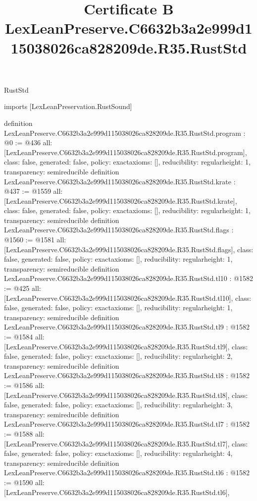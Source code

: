 \begin{lexlean}{RustStd}
\title{Certificate B LexLeanPreserve.C6632b3a2e999d115038026ca828209de.R35.RustStd}
\begin{coremodule}
imports [LexLeanPreservation.RustSound]

definition LexLeanPreserve.C6632b3a2e999d115038026ca828209de.R35.RustStd.program : @0 := @436 {
  all: [LexLeanPreserve.C6632b3a2e999d115038026ca828209de.R35.RustStd.program],
  class: false,
  generated: false,
  policy: exact{axioms: []},
  reducibility: regular{height: 1},
  transparency: semireducible
}
definition LexLeanPreserve.C6632b3a2e999d115038026ca828209de.R35.RustStd.krate : @437 := @1559 {
  all: [LexLeanPreserve.C6632b3a2e999d115038026ca828209de.R35.RustStd.krate],
  class: false,
  generated: false,
  policy: exact{axioms: []},
  reducibility: regular{height: 1},
  transparency: semireducible
}
definition LexLeanPreserve.C6632b3a2e999d115038026ca828209de.R35.RustStd.flags : @1560 := @1581 {
  all: [LexLeanPreserve.C6632b3a2e999d115038026ca828209de.R35.RustStd.flags],
  class: false,
  generated: false,
  policy: exact{axioms: []},
  reducibility: regular{height: 1},
  transparency: semireducible
}
definition LexLeanPreserve.C6632b3a2e999d115038026ca828209de.R35.RustStd.tl10 : @1582 := @425 {
  all: [LexLeanPreserve.C6632b3a2e999d115038026ca828209de.R35.RustStd.tl10],
  class: false,
  generated: false,
  policy: exact{axioms: []},
  reducibility: regular{height: 1},
  transparency: semireducible
}
definition LexLeanPreserve.C6632b3a2e999d115038026ca828209de.R35.RustStd.tl9 : @1582 := @1584 {
  all: [LexLeanPreserve.C6632b3a2e999d115038026ca828209de.R35.RustStd.tl9],
  class: false,
  generated: false,
  policy: exact{axioms: []},
  reducibility: regular{height: 2},
  transparency: semireducible
}
definition LexLeanPreserve.C6632b3a2e999d115038026ca828209de.R35.RustStd.tl8 : @1582 := @1586 {
  all: [LexLeanPreserve.C6632b3a2e999d115038026ca828209de.R35.RustStd.tl8],
  class: false,
  generated: false,
  policy: exact{axioms: []},
  reducibility: regular{height: 3},
  transparency: semireducible
}
definition LexLeanPreserve.C6632b3a2e999d115038026ca828209de.R35.RustStd.tl7 : @1582 := @1588 {
  all: [LexLeanPreserve.C6632b3a2e999d115038026ca828209de.R35.RustStd.tl7],
  class: false,
  generated: false,
  policy: exact{axioms: []},
  reducibility: regular{height: 4},
  transparency: semireducible
}
definition LexLeanPreserve.C6632b3a2e999d115038026ca828209de.R35.RustStd.tl6 : @1582 := @1590 {
  all: [LexLeanPreserve.C6632b3a2e999d115038026ca828209de.R35.RustStd.tl6],
}
\end{coremodule}
\end{lexlean}

